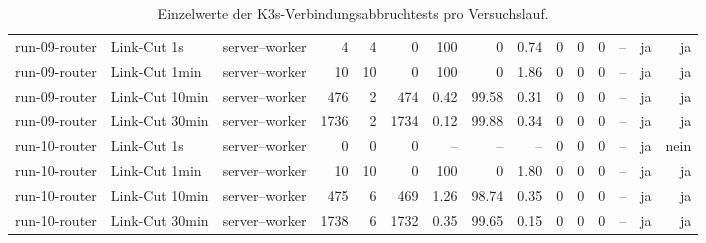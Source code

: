 \begin{table}
{\begin{tabular}{l l p{3.2cm} r r r r r r r r r r r r}
run-09-router & Link-Cut 1s & server--worker & 4 & 4 & 0 & 100 & 0 & 0.74 & 0 & 0 & 0 & -- & ja & ja \\
run-09-router & Link-Cut 1min & server--worker & 10 & 10 & 0 & 100 & 0 & 1.86 & 0 & 0 & 0 & -- & ja & ja \\
run-09-router & Link-Cut 10min & server--worker & 476 & 2 & 474 & 0.42 & 99.58 & 0.31 & 0 & 0 & 0 & -- & ja & ja \\
run-09-router & Link-Cut 30min & server--worker & 1736 & 2 & 1734 & 0.12 & 99.88 & 0.34 & 0 & 0 & 0 & -- & ja & ja \\
run-10-router & Link-Cut 1s & server--worker & 0 & 0 & 0 & -- & -- & -- & 0 & 0 & 0 & -- & ja & nein \\
run-10-router & Link-Cut 1min & server--worker & 10 & 10 & 0 & 100 & 0 & 1.80 & 0 & 0 & 0 & -- & ja & ja \\
run-10-router & Link-Cut 10min & server--worker & 475 & 6 & 469 & 1.26 & 98.74 & 0.35 & 0 & 0 & 0 & -- & ja & ja \\
run-10-router & Link-Cut 30min & server--worker & 1738 & 6 & 1732 & 0.35 & 99.65 & 0.15 & 0 & 0 & 0 & -- & ja & ja \\
\bottomrule
\end{tabular}%
}
\caption{Einzelwerte der K3s-Verbindungsabbruchtests pro Versuchslauf.}
\label{tab:appendix-k3s-link-cut-runs}
\end{table}
